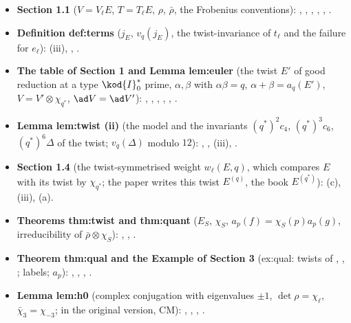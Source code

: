 \begin{itemize}
\item \textbf{Section 1.1} ($V=V_\ell E$, $T=T_\ell E$, $\rho$, $\bar\rho$, the Frobenius conventions): , , , ,
, .
\item \textbf{Definition def:terms} ($j_E$, $v_q(j_E)$, the twist-invariance of $t_\ell$ and the failure for $e_\ell$): (iii), ,
.
\item \textbf{The table of Section 1 and Lemma lem:euler} (the twist $E'$ of good reduction at a type $\kod{I}_0^*$ prime, $\alpha,\beta$ with $\alpha\beta=q$, $\alpha+\beta=a_q(E')$, $V=V'\otimes\chi_{q^*}$, $\ad V=\ad V'$):
, , , , , .
\item \textbf{Lemma lem:twist (ii)} (the model and the invariants $(q^*)^2c_4$, $(q^*)^3c_6$, $(q^*)^6\Delta$ of the twist; $v_q(\Delta)$ modulo $12$): , ,
(iii), .
\item \textbf{Section 1.4} (the twist-symmetrised weight $w_\ell(E,q)$, which compares $E$ with its twist by $\chi_{q^*}$; the paper writes this twist $E^{(q)}$, the book
$E^{(q^*)}$): (c), (iii), (a).
\item \textbf{Theorems thm:twist and thm:quant} ($E_S$, $\chi_S$, $a_p(f)=\chi_S(p)a_p(g)$, irreducibility of $\bar\rho\otimes\chi_S$): , ,
.
\item \textbf{Theorem thm:qual and the Example of Section 3} (ex:qual: twists of , , ; labels; $a_p$): , ,
, .
\item \textbf{Lemma lem:h0} (complex conjugation with eigenvalues $\pm1$, $\det\rho=\chi_\ell$, $\bar\chi_3=\chi_{-3}$; in the original version, CM): , ,
, .

\end{itemize}
